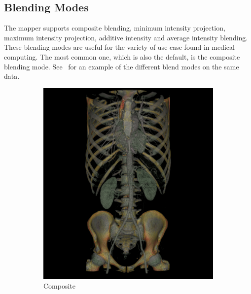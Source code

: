 \subsection{Blending Modes}
\label{blending-modes}
The mapper supports composite blending, minimum intensity projection, maximum
intensity projection, additive intensity and average intensity blending.  These
blending modes are useful for the variety of use case found in medical
computing.  The most common one, which is also the default, is the composite
blending mode.  See~ for an example of the different
blend modes on the same data.

\begin{figure}[htb]
  \centering%
  \begin{subfigure}{.5\columnwidth}
    \includegraphics[width=\columnwidth]{TorsoBlendingComposite}
    \caption{Composite}
    \label{fig:blendcomposite}
  \end{subfigure}%
  \begin{subfigure}{.5\columnwidth}

\end{subfigure}
\end{figure}
